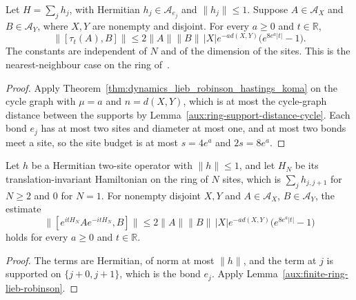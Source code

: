 \begin{lemma}
    \label{aux:finite-ring-lieb-robinson}
    \leanok
    Let $H=\sum_j h_j$, with Hermitian $h_j\in\mathcal A_{e_j}$ and
    $\|h_j\|\leq1$. Suppose $A\in\mathcal A_X$ and $B\in\mathcal A_Y$,
    where $X,Y$ are nonempty and disjoint. For every $a\geq0$ and $t\in\mathbb R$,
    \[
        \|[\tau_t(A),B]\|
        \leq2\|A\|\|B\|\,|X|e^{-a d(X,Y)}
        \bigl(e^{8e^a|t|}-1\bigr).
    \]
    The constants are independent of $N$ and of the dimension of the sites. This is the
    nearest-neighbour case on the ring of~\cite[Appendix~A,
        Theorem~A.2]{HastingsKoma2006SpectralGap}.
\end{lemma}
\begin{proof}\leanok
    Apply Theorem~\ref{thm:dynamics_lieb_robinson_hastings_koma} on the cycle graph with
    $\mu=a$ and $n=d(X,Y)$, which is at most the cycle-graph distance between the supports
    by Lemma~\ref{aux:ring-support-distance-cycle}. Each bond $e_j$ has at most two sites
    and diameter at most one, and at most two bonds meet a site, so the site budget is at
    most $s=4e^a$ and $2s=8e^a$.
\end{proof}

\begin{lemma}
    \label{aux:interaction-hamiltonian-lieb-robinson}
    \leanok
    Let $h$ be a Hermitian two-site operator with $\|h\|\leq1$, and let
    $H_N$ be its translation-invariant Hamiltonian on the ring of $N$ sites, which is
    $\sum_j h_{j,j+1}$ for $N\geq2$ and $0$ for $N=1$. For nonempty disjoint $X,Y$ and
    $A\in\mathcal A_X$, $B\in\mathcal A_Y$, the estimate
    \[
        \|[e^{itH_N}Ae^{-itH_N},B]\|
        \leq2\|A\|\|B\|\,|X|e^{-a d(X,Y)}
        \bigl(e^{8e^a|t|}-1\bigr)
    \]
    holds for every $a\geq0$ and $t\in\mathbb R$.
\end{lemma}
\begin{proof}\leanok
    The terms are Hermitian, of norm at most $\|h\|$, and the term at $j$ is supported on
    $\{j+0,j+1\}$, which is the bond $e_j$.
    Apply Lemma~\ref{aux:finite-ring-lieb-robinson}.
\end{proof}
